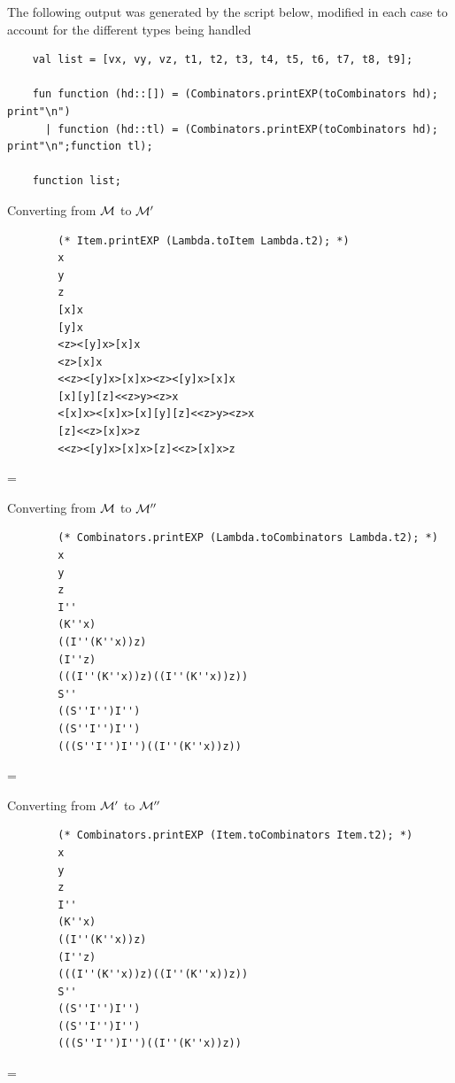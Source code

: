 \documentclass[11pt]{article}
\newenvironment{neverbreak} %
{\par\nobreak\vfil\penalty0\vfilneg
	\vtop\bgroup}
{\par\xdef\tpd{\the\prevdepth}\egroup
	\prevdepth=\tpd}
\begin{document}
\begin{enumerate}
The following output was generated by the script below, modified in each case to account for the different types being handled
\begin{verbatim}
	val list = [vx, vy, vz, t1, t2, t3, t4, t5, t6, t7, t8, t9];

	fun function (hd::[]) = (Combinators.printEXP(toCombinators hd); print"\n")
	  | function (hd::tl) = (Combinators.printEXP(toCombinators hd); print"\n";function tl); 

	function list;
\end{verbatim}
\vspace{1cm}
\begin{neverbreak}
	Converting from ${\cal M}$ to ${\cal M}'$
	\begin{verbatim}
		(* Item.printEXP (Lambda.toItem Lambda.t2); *)
		x
		y
		z
		[x]x
		[y]x
		<z><[y]x>[x]x
		<z>[x]x
		<<z><[y]x>[x]x><z><[y]x>[x]x
		[x][y][z]<<z>y><z>x
		<[x]x><[x]x>[x][y][z]<<z>y><z>x
		[z]<<z>[x]x>z
		<<z><[y]x>[x]x>[z]<<z>[x]x>z
	\end{verbatim}
\end{neverbreak}
\vspace{1cm}
\begin{neverbreak}
	Converting from ${\cal M}$ to ${\cal M}''$
	\begin{verbatim}
		(* Combinators.printEXP (Lambda.toCombinators Lambda.t2); *)
		x
		y
		z
		I''
		(K''x)
		((I''(K''x))z)
		(I''z)
		(((I''(K''x))z)((I''(K''x))z))
		S''
		((S''I'')I'')
		((S''I'')I'')
		(((S''I'')I'')((I''(K''x))z))
	\end{verbatim}
\end{neverbreak}
\vspace{1cm}

\begin{neverbreak}
	Converting from ${\cal M}'$ to ${\cal M}''$
	\begin{verbatim}
		(* Combinators.printEXP (Item.toCombinators Item.t2); *)
		x
		y
		z
		I''
		(K''x)
		((I''(K''x))z)
		(I''z)
		(((I''(K''x))z)((I''(K''x))z))
		S''
		((S''I'')I'')
		((S''I'')I'')
		(((S''I'')I'')((I''(K''x))z))
	\end{verbatim}
\end{neverbreak}


\end{enumerate}
\end{document}
